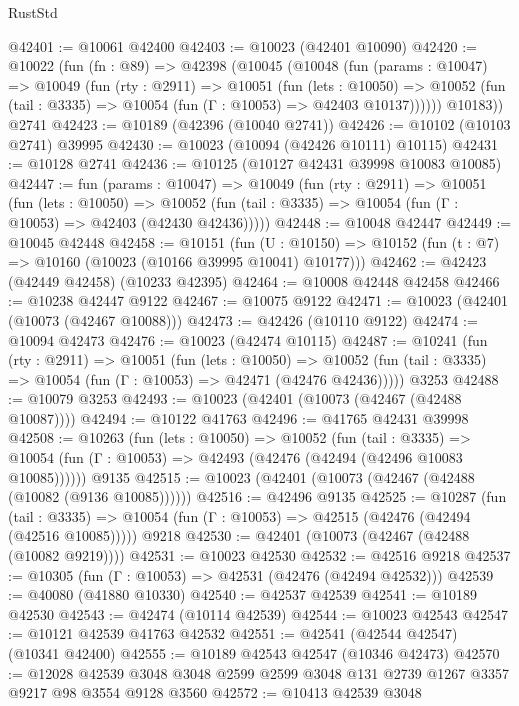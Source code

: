 \begin{lexlean}{RustStd}
\begin{coremodule}
@42401 := @10061 @42400
@42403 := @10023 (@42401 @10090)
@42420 := @10022
    (fun (fn : @89) =>
    @42398
      (@10045
        (@10048
          (fun (params : @10047) =>
          @10049
            (fun (rty : @2911) =>
            @10051
              (fun (lets : @10050) =>
              @10052 (fun (tail : @3335) => @10054 (fun (Γ : @10053) => @42403 @10137))))))
        @10183))
    @2741
@42423 := @10189 (@42396 (@10040 @2741))
@42426 := @10102 (@10103 @2741) @39995
@42430 := @10023 (@10094 (@42426 @10111) @10115)
@42431 := @10128 @2741
@42436 := @10125 (@10127 @42431 @39998 @10083 @10085)
@42447 := fun (params : @10047) =>
  @10049
    (fun (rty : @2911) =>
    @10051
      (fun (lets : @10050) =>
      @10052 (fun (tail : @3335) => @10054 (fun (Γ : @10053) => @42403 (@42430 @42436)))))
@42448 := @10048 @42447
@42449 := @10045 @42448
@42458 := @10151
    (fun (U : @10150) => @10152 (fun (t : @7) => @10160 (@10023 (@10166 @39995 @10041) @10177)))
@42462 := @42423 (@42449 @42458) (@10233 @42395)
@42464 := @10008 @42448 @42458
@42466 := @10238 @42447 @9122
@42467 := @10075 @9122
@42471 := @10023 (@42401 (@10073 (@42467 @10088)))
@42473 := @42426 (@10110 @9122)
@42474 := @10094 @42473
@42476 := @10023 (@42474 @10115)
@42487 := @10241
    (fun (rty : @2911) =>
    @10051
      (fun (lets : @10050) =>
      @10052 (fun (tail : @3335) => @10054 (fun (Γ : @10053) => @42471 (@42476 @42436)))))
    @3253
@42488 := @10079 @3253
@42493 := @10023 (@42401 (@10073 (@42467 (@42488 @10087))))
@42494 := @10122 @41763
@42496 := @41765 @42431 @39998
@42508 := @10263
    (fun (lets : @10050) =>
    @10052
      (fun (tail : @3335) =>
      @10054 (fun (Γ : @10053) => @42493 (@42476 (@42494 (@42496 @10083 @10085))))))
    @9135
@42515 := @10023 (@42401 (@10073 (@42467 (@42488 (@10082 (@9136 @10085))))))
@42516 := @42496 @9135
@42525 := @10287
    (fun (tail : @3335) => @10054 (fun (Γ : @10053) => @42515 (@42476 (@42494 (@42516 @10085)))))
    @9218
@42530 := @42401 (@10073 (@42467 (@42488 (@10082 @9219))))
@42531 := @10023 @42530
@42532 := @42516 @9218
@42537 := @10305 (fun (Γ : @10053) => @42531 (@42476 (@42494 @42532)))
@42539 := @40080 (@41880 @10330)
@42540 := @42537 @42539
@42541 := @10189 @42530
@42543 := @42474 (@10114 @42539)
@42544 := @10023 @42543
@42547 := @10121 @42539 @41763 @42532
@42551 := @42541 (@42544 @42547) (@10341 @42400)
@42555 := @10189 @42543 @42547 (@10346 @42473)
@42570 := @12028
    @42539
    @3048
    @3048
    @2599
    @2599
    @3048
    @131
    @2739
    @1267
    @3357
    @9217
    @98
    @3554
    @9128
    @3560
@42572 := @10413 @42539 @3048

\end{coremodule}
\end{lexlean}
